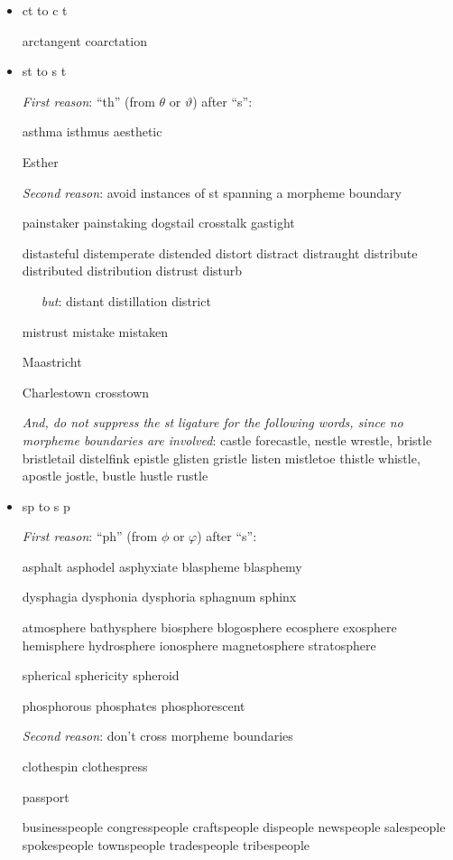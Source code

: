 \begin{itemize}

\item ct to c\kern0pt t

arctangent coarctation



\item st to s\kern0pt t

\emph{First reason}: ``th'' (from $\theta$ or $\vartheta$) after ``s'':

asthma isthmus aesthetic

Esther

\medskip
\emph{Second reason}: avoid instances of st spanning a morpheme boundary

painstaker painstaking dogstail crosstalk gastight

distasteful distemperate distended distort distract distraught distribute distributed distribution  distrust disturb

\ \ \ \emph{but}: distant distillation district

mistrust mistake mistaken

Maastricht

Charlestown crosstown

\emph{And, do not suppress the st ligature for the following words, since no morpheme boundaries are involved}: castle forecastle, nestle wrestle, bristle bristletail distelfink epistle glisten gristle listen mistletoe thistle whistle, apostle jostle, bustle hustle rustle



\item sp to s\kern0pt p

\emph{First reason}: ``ph'' (from $\phi$ or $\varphi$) after ``s'':

asphalt asphodel asphyxiate blaspheme blasphemy

dysphagia dysphonia dysphoria sphagnum sphinx

atmosphere bathysphere biosphere blogosphere ecosphere exosphere hemisphere hydrosphere ionosphere magnetosphere stratosphere

spherical sphericity spheroid 

phosphorous phosphates phosphorescent

\medskip
\emph{Second reason}: don't cross morpheme boundaries

clothespin clothespress 

passport

businesspeople congresspeople craftspeople dispeople newspeople salespeople spokespeople townspeople tradespeople tribespeople


\end{itemize}

